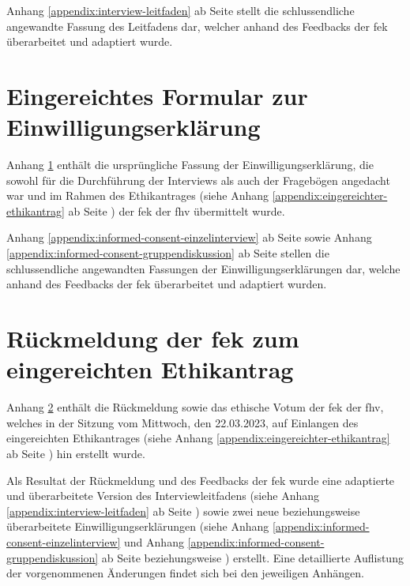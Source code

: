 \documentclass[a4paper,12pt,twoside]{scrreprt}
\begin{document}
Anhang \ref{appendix:interview-leitfaden} ab Seite \pageref{appendix:interview-leitfaden} stellt die schlussendliche angewandte Fassung des Leitfadens dar, welcher anhand des Feedbacks der \ac{fek} überarbeitet und adaptiert wurde.



\cleardoublepage
\chapter{Eingereichtes Formular zur Einwilligungserklärung}
\label{appendix:ursprüngliches-informed-consent-formular}

Anhang \ref{appendix:ursprüngliches-informed-consent-formular} enthält die ursprüngliche Fassung der Einwilligungserklärung, die sowohl für die Durchführung der Interviews als auch der Fragebögen angedacht war und im Rahmen des Ethikantrages (siehe Anhang \ref{appendix:eingereichter-ethikantrag} ab Seite \pageref{appendix:eingereichter-ethikantrag}) der \acl{fek} der \acl{fhv} übermittelt wurde.

\medskip

Anhang \ref{appendix:informed-consent-einzelinterview} ab Seite \pageref{appendix:informed-consent-einzelinterview} sowie Anhang \ref{appendix:informed-consent-gruppendiskussion} ab Seite \pageref{appendix:informed-consent-gruppendiskussion} stellen die schlussendliche angewandten Fassungen der Einwilligungserklärungen dar, welche anhand des Feedbacks der \ac{fek} überarbeitet und adaptiert wurden.



\cleardoublepage
\chapter{Rückmeldung der \acl{fek} zum eingereichten Ethikantrag}
\label{appendix:rückmeldung-fek}

Anhang \ref{appendix:rückmeldung-fek} enthält die Rückmeldung sowie das ethische Votum der \acl{fek} der \acl{fhv}, welches in der Sitzung vom Mittwoch, den 22.03.2023, auf Einlangen des eingereichten Ethikantrages (siehe Anhang \ref{appendix:eingereichter-ethikantrag} ab Seite \pageref{appendix:eingereichter-ethikantrag}) hin erstellt wurde.

\medskip

Als Resultat der Rückmeldung und des Feedbacks der \ac{fek} wurde eine adaptierte und überarbeitete Version des Interviewleitfadens (siehe Anhang \ref{appendix:interview-leitfaden} ab Seite \pageref{appendix:interview-leitfaden}) sowie zwei neue beziehungsweise überarbeitete Einwilligungserklärungen (siehe Anhang \ref{appendix:informed-consent-einzelinterview} und Anhang \ref{appendix:informed-consent-gruppendiskussion} ab Seite \pageref{appendix:informed-consent-einzelinterview} beziehungsweise \pageref{appendix:informed-consent-gruppendiskussion}) erstellt. Eine detaillierte Auflistung der vorgenommenen Änderungen findet sich bei den jeweiligen Anhängen.
\end{document}
